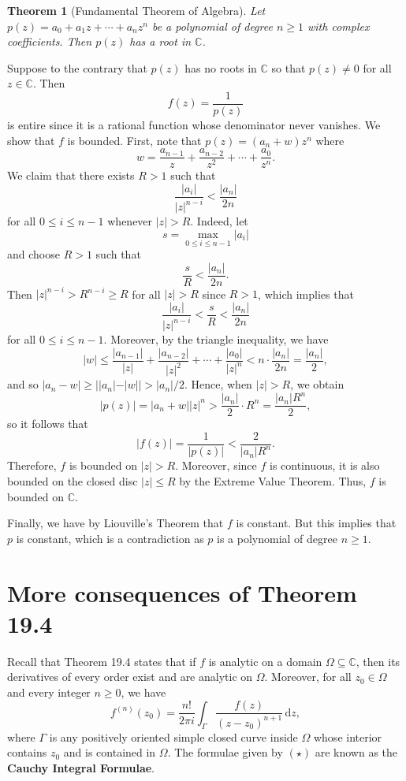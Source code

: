 \documentclass[10pt]{article}
\makeatletter
\newcommand{\C}{\mathbb{C}}
\newcommand{\dd}{\,\mathrm{d}}
\theoremstyle{newstyle}
\newtheorem{thm}{Theorem}[section]
\newenvironment{pf}[1][\proofname]{\par
  \pushQED{\qed}%
  \normalfont \topsep0\p@\relax
  \trivlist
  \item[\hskip\labelsep\scshape
  #1\@addpunct{.}]\ignorespaces
}{%
  \popQED\endtrivlist\@endpefalse
}
\makeatother
\begin{document}
\begin{thm}[Fundamental Theorem of Algebra]
Let $p(z) = a_0 + a_1z + \cdots + a_n z^n$ be a polynomial of degree $n \geq 1$ 
with complex coefficients. Then $p(z)$ has a root in $\C$. 
\end{thm}
\begin{pf}
Suppose to the contrary that $p(z)$ has no roots in $\C$ so that $p(z) \neq 0$ for all 
$z \in \C$. Then 
\[ f(z) = \frac1{p(z)} \] 
is entire since it is a rational function whose denominator never vanishes. We show that 
$f$ is bounded. First, note that $p(z) = (a_n + w)z^n$ where 
\[ w = \frac{a_{n-1}}z + \frac{a_{n-2}}{z^2} + \cdots + \frac{a_0}{z^n}. \]
We claim that there exists $R > 1$ such that 
\[ \frac{|a_i|}{|z|^{n-i}} < \frac{|a_n|}{2n} \]
for all $0 \leq i \leq n-1$ whenever $|z| > R$. Indeed, let 
\[ s = \max_{0\leq i \leq n-1} |a_i| \]
and choose $R > 1$ such that 
\[ \frac sR < \frac{|a_n|}{2n}. \]
Then $|z|^{n-i} > R^{n-i} \geq R$ for all $|z| > R$ since $R > 1$, which implies that 
\[ \frac{|a_i|}{|z|^{n-i}} < \frac sR < \frac{|a_n|}{2n} \]
for all $0 \leq i \leq n-1$. Moreover, by the triangle inequality, we have 
\[ |w| \leq \frac{|a_{n-1}|}{|z|} + \frac{|a_{n-2}|}{|z|^2} + \cdots + \frac{|a_0|}{|z|^n} 
< n \cdot \frac{|a_n|}{2n} = \frac{|a_n|}2, \]
and so $|a_n - w| \geq ||a_n| - |w|| > |a_n|/2$. Hence, when $|z| > R$, we obtain 
\[ |p(z)| = |a_n + w||z|^n > \frac{|a_n|}2 \cdot R^n = \frac{|a_n|R^n}2, \]
so it follows that 
\[ |f(z)| = \frac{1}{|p(z)|} < \frac{2}{|a_n|R^n}. \]
Therefore, $f$ is bounded on $|z| > R$. Moreover, since $f$ is continuous, it is also bounded on the 
closed disc $|z| \leq R$ by the Extreme Value Theorem. Thus, $f$ is bounded on $\C$. 

Finally, we have by Liouville's Theorem that $f$ is constant. But this implies that $p$ 
is constant, which is a contradiction as $p$ is a polynomial of degree $n \geq 1$.
\end{pf}

\newpage 
\section{More consequences of Theorem 19.4}

Recall that Theorem 19.4 states that if $f$ is analytic on a domain $\Omega \subseteq \C$, then 
its derivatives of every order exist and are analytic on $\Omega$. Moreover, for all 
$z_0 \in \Omega$ and every integer $n \geq 0$, we have 
\[ f^{(n)}(z_0) = \frac{n!}{2\pi i} \int_\Gamma \frac{f(z)}{(z-z_0)^{n+1}}\dd z \tag{$\star$}, \] 
where $\Gamma$ is any positively oriented simple closed curve inside $\Omega$ whose 
interior contains $z_0$ and is contained in $\Omega$. The formulae given by 
$(\star)$ are known as the {\bf Cauchy Integral Formulae}. 
\end{document}
